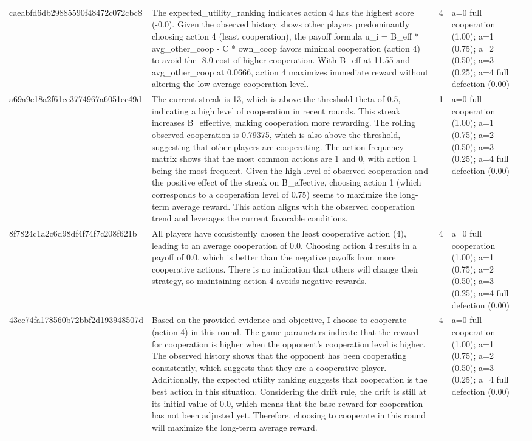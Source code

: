 \begin{tabular}{lp{8cm}ll l}
caeabfd6db29885590f48472c072cbc8 & The expected\_utility\_ranking indicates action 4 has the highest score (-0.0). Given the observed history shows other players predominantly choosing action 4 (least cooperation), the payoff formula u\_i = B\_eff * avg\_other\_coop - C * own\_coop favors minimal cooperation (action 4) to avoid the -8.0 cost of higher cooperation. With B\_eff at 11.55 and avg\_other\_coop at 0.0666, action 4 maximizes immediate reward without altering the low average cooperation level. & 4 & a=0 full cooperation (1.00); a=1 (0.75); a=2 (0.50); a=3 (0.25); a=4 full defection (0.00) &  \\
a69a9e18a2f61cc3774967a6051ec49d & The current streak is 13, which is above the threshold theta of 0.5, indicating a high level of cooperation in recent rounds. This streak increases B\_effective, making cooperation more rewarding. The rolling observed cooperation is 0.79375, which is also above the threshold, suggesting that other players are cooperating. The action frequency matrix shows that the most common actions are 1 and 0, with action 1 being the most frequent. Given the high level of observed cooperation and the positive effect of the streak on B\_effective, choosing action 1 (which corresponds to a cooperation level of 0.75) seems to maximize the long-term average reward. This action aligns with the observed cooperation trend and leverages the current favorable conditions. & 1 & a=0 full cooperation (1.00); a=1 (0.75); a=2 (0.50); a=3 (0.25); a=4 full defection (0.00) &  \\
8f7824c1a2c6d98df4f74f7c208f621b & All players have consistently chosen the least cooperative action (4), leading to an average cooperation of 0.0. Choosing action 4 results in a payoff of 0.0, which is better than the negative payoffs from more cooperative actions. There is no indication that others will change their strategy, so maintaining action 4 avoids negative rewards. & 4 & a=0 full cooperation (1.00); a=1 (0.75); a=2 (0.50); a=3 (0.25); a=4 full defection (0.00) &  \\
43cc74fa178560b72bbf2d193948507d & Based on the provided evidence and objective, I choose to cooperate (action 4) in this round. The game parameters indicate that the reward for cooperation is higher when the opponent's cooperation level is higher. The observed history shows that the opponent has been cooperating consistently, which suggests that they are a cooperative player. Additionally, the expected utility ranking suggests that cooperation is the best action in this situation. Considering the drift rule, the drift is still at its initial value of 0.0, which means that the base reward for cooperation has not been adjusted yet. Therefore, choosing to cooperate in this round will maximize the long-term average reward. & 4 & a=0 full cooperation (1.00); a=1 (0.75); a=2 (0.50); a=3 (0.25); a=4 full defection (0.00) &  \\

\end{tabular}
